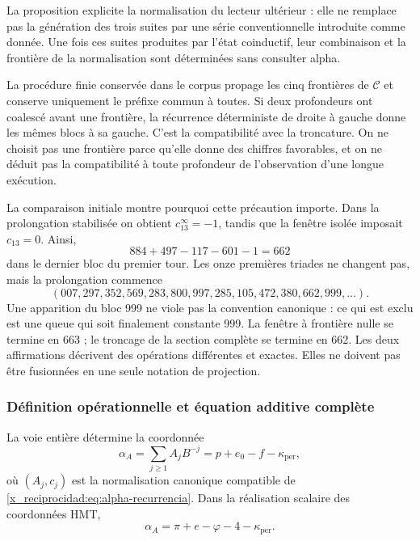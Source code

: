 La proposition explicite la normalisation du lecteur ultérieur : elle ne remplace pas la génération des trois suites par une série conventionnelle introduite comme donnée. Une fois ces suites produites par l'état coinductif, leur combinaison et la frontière de la normalisation sont déterminées sans consulter alpha.

La procédure finie conservée dans le corpus propage les cinq
frontières de \(\mathcal C\) et conserve uniquement le préfixe commun à
toutes. Si deux profondeurs ont coalescé avant une frontière,
la récurrence déterministe de droite à gauche donne les mêmes blocs
à sa gauche. C'est la compatibilité avec la troncature. On ne
choisit pas une frontière parce qu'elle donne des chiffres favorables, et on ne déduit pas la
compatibilité à toute profondeur de l'observation d'une longue exécution.

La comparaison initiale montre pourquoi cette précaution importe. Dans
la prolongation stabilisée on obtient \(c_{13}^{\infty}=-1\), tandis
que la fenêtre isolée imposait \(c_{13}=0\). Ainsi,
\[
 884+497-117-601-1=662
\]
dans le dernier bloc du premier tour. Les onze premières triades ne
changent pas, mais la prolongation commence
\[
 (007,297,352,569,283,800,997,285,105,472,380,662,999,\ldots).
\]
Une apparition du bloc 999 ne viole pas la convention canonique : ce
qui est exclu est une queue qui soit finalement constante 999. La fenêtre
à frontière nulle se termine en 663 ; le troncage de la section complète
se termine en 662. Les deux affirmations décrivent des opérations différentes
et exactes. Elles ne doivent pas être fusionnées en une seule notation de projection.

\subsubsection{Définition opérationnelle et équation additive complète}
\label{x_reciprocidad:subsec:alpha-definicion}

\begin{definition}
\label{x_reciprocidad:def:alpha-operativa}
La voie entière détermine la coordonnée
\begin{equation}
 \alpha_A=\sum_{j\geq1}A_jB^{-j}
 =p+e_0-f-\kappa_{\mathrm{per}},
 \label{x_reciprocidad:eq:alpha-via-a}
\end{equation}
où \((A_j,c_j)\) est la normalisation canonique compatible de
\eqref{x_reciprocidad:eq:alpha-recurrencia}. Dans la réalisation scalaire des
coordonnées HMT,
\begin{equation}
 \boxed{\alpha_A=
 \pi+e-\varphi
 -4-\kappa_{\mathrm{per}}.}
 \label{x_reciprocidad:eq:alpha-identidad-completa}
\end{equation}
\end{definition}

